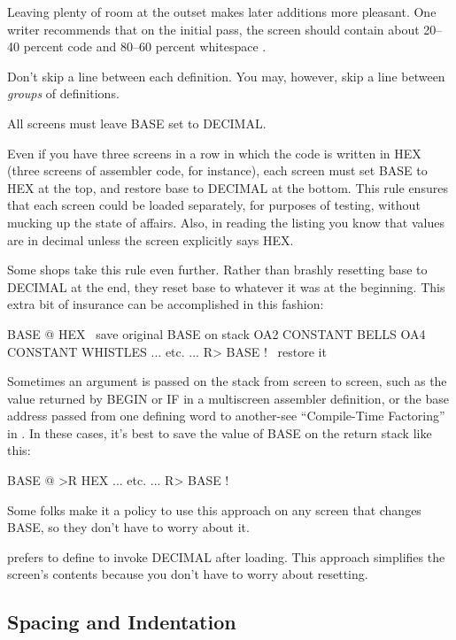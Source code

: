 Leaving plenty of room at the outset makes later additions more
pleasant.  One writer recommends that on the initial pass, the screen
should contain about 20--40 percent code and 80--60 percent whitespace \cite{stevenson81}.

Don't skip a line between each definition.  You may, however, skip a
line between \emph{groups} of definitions.
\begin{tip}
All screens must leave BASE set to DECIMAL.
\end{tip}
Even if you have three screens in a row in which the code is written in
HEX (three screens of assembler code, for instance), each screen must set
BASE to HEX at the top, and restore base to DECIMAL at the bottom.
This rule ensures that each screen could be loaded separately, for purposes
of testing, without mucking up the state of affairs.  Also, in reading
the listing you know that values are in decimal unless the screen explicitly
says HEX.

Some shops take this rule even further.  Rather than brashly resetting
base to DECIMAL at the end, they reset base to whatever it was
at the beginning.  This extra bit of insurance can be accomplished in this
fashion:
\begin{Code}
BASE @          HEX     \ save original BASE on stack
OA2 CONSTANT BELLS
OA4 CONSTANT WHISTLES
... etc. ...
R> BASE !               \ restore it
\end{Code}

Sometimes an argument is passed on the stack from screen to screen,
such as the value returned by BEGIN or IF in a multiscreen assembler
definition, or the base address passed from one defining word to
another-see ``Compile-Time Factoring'' in .  In these cases,
it's best to save the value of BASE on
the return stack like this:
\begin{Code}
BASE @ >R HEX
... etc. ...
R> BASE !
\end{Code}

Some folks make it a policy to use this approach on any screen that
changes BASE, so they don't have to worry about it.

 prefers to define  to
invoke DECIMAL after loading.
This approach simplifies the screen's contents because you don't have to
worry about resetting.

\subsection{Spacing and Indentation}

